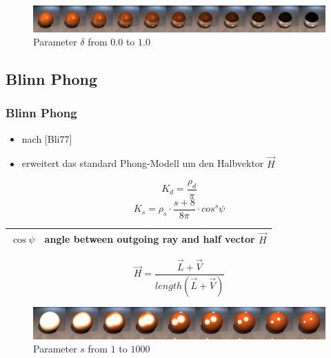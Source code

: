 \documentclass[11pt]{beamer}
\begin{document}
\begin{frame}[allowframebreaks]
\begin{figure}[H]
\includegraphics[width=\textwidth]{../phongreflcomplete}
\caption{Parameter $\delta$ from $0.0$ to $1.0$}
\end{figure}

\end{frame}



\subsection{Blinn Phong}
\begin{frame}[allowframebreaks]
\frametitle{Blinn Phong}
\begin{itemize}
\item nach [Bli77]
\item erweitert das standard Phong-Modell um den Halbvektor $\vec{H}$
\end{itemize}

\begin{equation}
K_d = \frac{\rho_d}{\pi}
\end{equation}
\begin{equation}
K_s = \rho_s \cdot \frac{s+8}{8\pi} \cdot cos^s\psi
\end{equation}

\begin{table}[H]
\begin{tabular}{| c | l |}
\hline
$\cos\psi$ & angle between outgoing ray and half vector $\vec{H}$\\ \hline
\end{tabular}
\end{table}
\begin{equation}
\vec{H} = \frac{\vec{L}+\vec{V}}{length(\vec{L}+\vec{V})}
\end{equation}

\begin{figure}[H]
\includegraphics[width=\textwidth]{../blinnphongshinecomplete}
\caption{Parameter $s$ from $1$ to $1000$}
\end{figure}


\end{frame}
\end{document}
